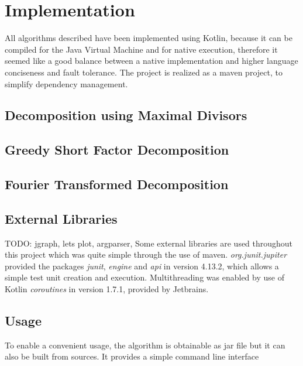\chapter{Implementation}
\label{ch:Implementation}
All algorithms described have been implemented using Kotlin, because it can be compiled for the Java Virtual Machine and for native execution, therefore it seemed like a good balance between a native implementation and higher language conciseness and fault tolerance. The project is realized as a maven project, to simplify dependency management.

\section{Decomposition using Maximal Divisors}

\section{Greedy Short Factor Decomposition}

\section{Fourier Transformed Decomposition}

\section{External Libraries}
TODO: jgraph, lets plot, argparser, 
Some external libraries are used throughout this project which was quite simple through the use of maven. \emph{org.junit.jupiter} provided the packages \emph{junit}, \emph{engine} and \emph{api} in version 4.13.2, which allows a simple test unit creation and execution. Multithreading was enabled by use of Kotlin \emph{coroutines} in version 1.7.1, provided by Jetbrains.

\section{Usage}
To enable a convenient usage, the algorithm is obtainable as jar file but it can also be built from sources. It provides a simple command line interface
